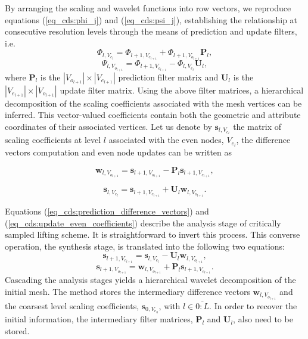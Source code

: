 \documentclass[graybox]{svmult}
\begin{document}
	
	By arranging the scaling and wavelet functions into row vectors, we reproduce equations (\ref{eq_cds:phi_j}) and (\ref{eq_cds:psi_j}), establishing the relationship at consecutive resolution levels through the means of prediction and update filters, i.e.
	\begin{equation}
	\Phi_{l,V_{e_l}} = \Phi_{l+1,V_{e_{l+1}}} +  \Phi_{l+1, V_{o_{l+1}}} \mathbf{P}_l,
	\label{eq_cds:prediction_functions}
	\end{equation}
	\begin{equation}
	\Psi_{l,V_{o_{l+1}}} = \Phi_{l+1,V_{o_{l+1}}} - \Phi_{l,V_{e_l}}  \mathbf{U}_l,
	\label{eq_cds:update_functions}
	\end{equation}
	where $\mathbf{P}_l$ is the $|V_{o_{l+1}}| \times |V_{e_{l+1}}|$ prediction filter matrix and $\mathbf{U}_l$ is the  $|V_{e_{l+1}}| \times |V_{o_{l+1}}|$ update filter matrix.
	Using the above filter matrices, a hierarchical decomposition of the scaling coefficients associated with the mesh vertices can be inferred. This vector-valued coefficients contain both the geometric and attribute coordinates of their associated vertices. Let us denote by $\mathbf{s}_{l,V_{e_l}}$ the matrix of scaling coefficients at level $l$ associated with the even nodes, $V_{e_l}$, the difference vectors computation and even node updates can be written as
	
	\begin{equation}
	\mathbf{w}_{l,V_{o_{l+1}}} = \mathbf{s}_{l+1,V_{o_{l+1}}} - \mathbf{P}_l \mathbf{s}_{l+1,V_{e_{l+1}}},
	\label{eq_cds:prediction_difference_vectors} 
	\end{equation}
	
	\begin{equation}
	\mathbf{s}_{l,V_{e_l}} = \mathbf{s}_{l+1,V_{e_{l+1}}} + \mathbf{U}_l \mathbf{w}_{l,V_{o_{l+1}}}.
	\label{eq_cds:update_even_coefficients}
	\end{equation}
	
	Equations (\ref{eq_cds:prediction_difference_vectors}) and (\ref{eq_cds:update_even_coefficients}) describe the analysis stage of critically sampled lifting scheme. It is straightforward
	to invert this process. This converse operation, the synthesis stage, is translated into the following two equations:
	\begin{equation}
	\mathbf{s}_{l+1,V_{e_{l+1}}} = \mathbf{s}_{l,V_{e_l}} - \mathbf{U}_l \mathbf{w}_{l,V_{o_{l+1}}},
	\label{eq_cds:synthesis_odd}
	\end{equation}
	\begin{equation}
	\mathbf{s}_{l+1,V_{o_{l+1}}} = \mathbf{w}_{l,V_{o_{l+1}}} + \mathbf{P}_l \mathbf{s}_{l+1,V_{e_{l+1}}}.
	\label{eq_cds:synthesis_even}
	\end{equation}
	Cascading the analysis stages yields a hierarchical wavelet decomposition of the initial mesh. The method stores the intermediary difference vectors $\mathbf{w}_{l,V_{o_{l+1}}}$ and the 
	coarsest level scaling coefficients, $\mathbf{s}_{0, V_{e_0}}$, with $l \in \overline{0:L}$. In order to recover the initial information, the intermediary filter matrices, $\mathbf{P}_l$ and
	$\mathbf{U}_l$, also need to be stored.
	
\end{document}

